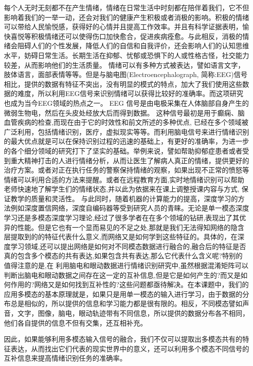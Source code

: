 	每个人无时无刻都不在产生情绪，情绪在日常生活中时刻都在陪伴着我们，它不但影响着我们的一举一动，还会对我们的健康产生积极或者消极的影响。积极的情绪可以带给人民愉悦感，获得好的心情并且提高工作效率。并且有科学证据表明，愉快喜悦等积极情绪还可以使得伤口加快愈合，促进疾病痊愈。与此相反，消极的情绪会阻碍人们的个性发展，降低人们的自信和自我评价，还会影响人们的认知思维水平，妨碍日常生活。长期生活在抑郁、忧郁或恐惧下的人或性格古怪，社交能力较差，从而影响他们的生活质量。
	情绪可以有多种方式被表达，譬如语言文字，肢体语言，面部表情等等。但是与脑电图(Electroencephalograph, 简称:EEG)信号相比，提供的数据有特征不突出，没有明显的模式的特点，加大了我们使用这些数据的难度，所以利用EEG信号来识别情绪可以获得比较好的准确率。而这项研究也成为当今EEG领域的热点之一。
	EEG 信号是由电极采集在人体脑部自身产生的微弱生物电，然后在头皮处经放大后而得到数据。 这种信号最初是用于癫痫、脑血管疾病的检查,而现在由于它的时效性和前文所述的多种优点, 已经在多个领域被广泛利用，包括情绪识别，医疗，虚拟现实等等。而利用脑电信号来进行情绪识别的最大优点就是可以在保持识别过程的迅速的基础上，有更好的准确率，为进一步的各个细分领域的研究打下了坚实的基础。举例来说，譬如帮助抑郁症患者或者受到重大精神打击的人进行情绪分析，从而让医生了解病人真正的情绪，提供更好的治疗方案。或者对正在执行任务的警察保持情绪的观察，如果出现不正常的愤怒等情绪可以利用合适的方法来提醒。或者在远程教育方面,实时地情绪识别可以帮助老师快速地了解学生们的情绪状态,并以此为依据来在课上调整授课内容与方式, 保证教学的质量和灵活性。
	与此同时，随着机器的计算能力的提高，深度学习的方法例如深度置信网络，深度自编码器等受到研究人员的青睐。无论是单一模态深度学习还是多模态深度学习理论,经过了很多学者在在多个领域的钻研,表现出了其优异的性能。但是它也有一个显而易见的不足之处,那就是我们无法得知网络的隐含层提取到的的特征代表什么意义,而网络又是如何学到这些特征的。具体的，在深度学习领域,还可以提出网络是如何对不同模态数据进行融合的,融合后的特征是否真的包含多个模态的共有表达,如果包含共有表达,那么它代表什么含义呢?特别的值得注意的是,在 利用脑电和眼动数据进行情绪识别研究中,虽然根据混淆矩阵可以判断出脑电和眼动数据之间存在这一定的互补信息,但是它是如何产生的?而又是如何作用的?网络又是如何找到互补性的?这些问题都亟待解决。在本课题中，我们的应用多模态的基本原理就是，如果只是用单一模态的输入进行学习，由于数据的分布总是相似的，所以提供的信息和学习能力都是很有限的。相反，不同模态譬如声音，文字，图像，脑电，眼动轨迹带有不同信息，所以提供的数据分布各不相同，他们各自提供的信息不但有交集，还互相补充。
	
	因此，如果能够利用多模态输入信号的融合，我们不仅可以提取出多模态共有的特征表达，从而找出它们代表的现实世界中的意义，还可以利用多个模态不同信号的互补信息来提高情绪识别任务的准确率。
	
